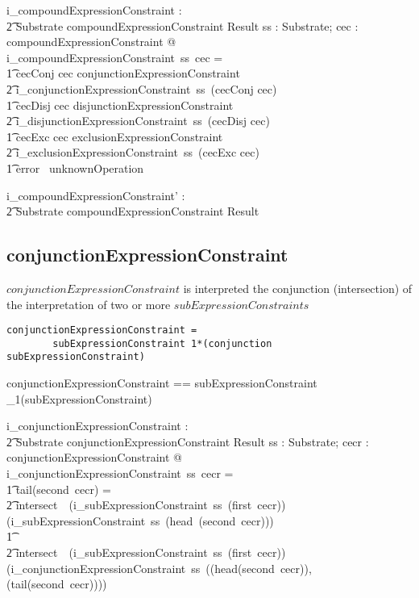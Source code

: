 \documentclass{article}
\begin{document}
\begin{gendef}
   i\_compoundExpressionConstraint : \\
\t2 Substrate \pfun compoundExpressionConstraint \pfun Result
\where
  \forall ss : Substrate; cec : compoundExpressionConstraint @ \\
 i\_compoundExpressionConstraint~ss~cec = \\
 \t1 \IF cecConj \inv cec \in conjunctionExpressionConstraint \\
\t2 \THEN i\_conjunctionExpressionConstraint~ss~(cecConj \inv cec) \\
 \t1 \ELSE \IF cecDisj \inv cec \in disjunctionExpressionConstraint \\
\t2 \THEN i\_disjunctionExpressionConstraint~ss~(cecDisj \inv cec) \\
 \t1 \ELSE \IF cecExc \inv cec \in exclusionExpressionConstraint \\
\t2 \THEN i\_exclusionExpressionConstraint~ss~(cecExc \inv cec) \\
\t1 \ELSE error~ unknownOperation
\end{gendef}

\begin{gendef}
   i\_compoundExpressionConstraint' : \\
\t2 Substrate \pfun compoundExpressionConstraint \pfun Result
\end{gendef}


\subsection{conjunctionExpressionConstraint}
$conjunctionExpressionConstraint$ is interpreted the conjunction (intersection) of the interpretation of two or more
$subExpressionConstraints$
\begin{verbatim}
conjunctionExpressionConstraint = 
        subExpressionConstraint 1*(conjunction subExpressionConstraint)
\end{verbatim}

\begin{zed}
conjunctionExpressionConstraint == subExpressionConstraint \cross \seq_1(subExpressionConstraint)
\end{zed}

\begin{gendef}
    i\_conjunctionExpressionConstraint : \\
\t2 Substrate \pfun conjunctionExpressionConstraint \pfun Result
\where
   \forall ss : Substrate;  cecr : conjunctionExpressionConstraint @ \\
i\_conjunctionExpressionConstraint~ss~cecr = \\
\t1 \IF tail(second~cecr) = \langle \rangle \THEN \\
\t2 intersect~~(i\_subExpressionConstraint~ss~(first~cecr)) (i\_subExpressionConstraint~ss~(head~(second~cecr))) \\
\t1 \ELSE \\
\t2 intersect~~(i\_subExpressionConstraint~ss~(first~cecr)) (i\_conjunctionExpressionConstraint~ss~((head(second~cecr)), (tail(second~cecr))))
\end{gendef}
\end{document}
